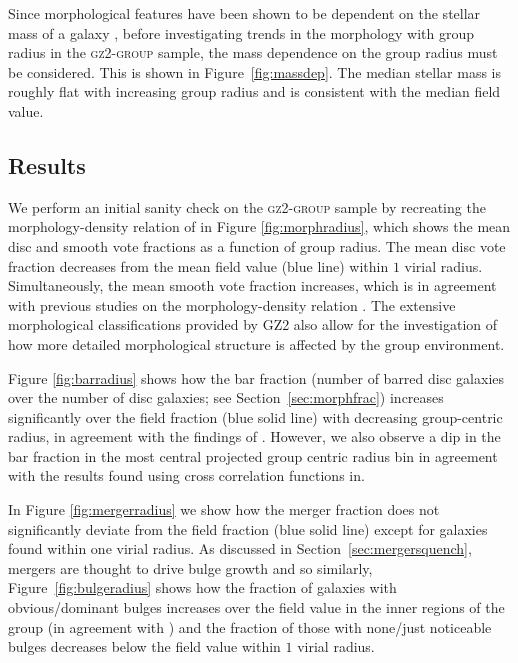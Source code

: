 \documentclass[useAMS,usenatbib]{mn2e}
\begin{document}
Since morphological features have been shown to be dependent on the stellar mass of a galaxy \citep[e.g. the increase in the bar fraction with stellar mass; see][]{nair10, skibba12}, before investigating trends in the morphology with group radius in the \textsc{gz2-group} sample, the mass dependence on the group radius must be considered. This is shown in Figure~\ref{fig:massdep}. The median stellar mass is roughly flat with increasing group radius and is consistent with the median field value. 

\subsection{Results}

We perform an initial sanity check on the \textsc{gz2-group} sample by recreating the morphology-density relation of \citet{dressler80} in Figure \ref{fig:morphradius}, which shows the mean disc and smooth vote fractions as a function of group radius. The mean disc vote fraction decreases from the mean field value (blue line) within $1$ virial radius. Simultaneously, the mean smooth vote fraction increases, which is in agreement with previous studies on the morphology-density relation \citep{dressler80, smail97, poggianti99, postman05, Bamford09}. The extensive morphological classifications provided by GZ2 also allow for the investigation of how more detailed morphological structure is affected by the group environment.  

Figure \ref{fig:barradius} shows how the bar fraction (number of barred disc galaxies over the number of disc galaxies; see Section~\ref{sec:morphfrac}) increases significantly over the field fraction (blue solid line) with decreasing group-centric radius, in agreement with the findings of \cite{barazza09}. However, we also observe a dip in the bar fraction in the most central projected group centric radius bin in agreement with the results found using cross correlation functions in\cite{skibba12}. 

In Figure \ref{fig:mergerradius} we show how the merger fraction does not significantly deviate from the field fraction (blue solid line) except for galaxies found within one virial radius. As discussed in Section~\ref{sec:mergersquench}, mergers are thought to drive bulge growth and so similarly, Figure~\ref{fig:bulgeradius} shows how the fraction of galaxies with obvious/dominant bulges increases over the field value in the inner regions of the group (in agreement with \citealt{diaferio01}) and the fraction of those with none/just noticeable bulges decreases below the field value within $1$ virial radius. 
\end{document}
